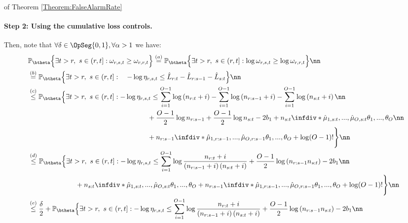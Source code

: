 \documentclass{article} %
\begin{document}
\begin{myproof}{of Theorem \ref{Theorem:FalseAlarmRate}}
	\paragraph{Step 2: Using the cumulative loss controls.}
	Then, note that $\forall \delta \in \OpSeg{0,1}, \forall \alpha > 1$ we have:
	\begin{align}
	&\mathbb{P}_{\btheta}\Big\{ \exists  t>r, \ s \in \left(r,t \right]: \omega_{r,s,t} \geq \omega_{r,r,t} \Big\} \overset{(a)}{=} \mathbb{P}_{\btheta}\Big\{ \exists  t>r, \ s \in \left(r,t \right]: \log \omega_{r,s,t} \geq \log \omega_{r,r,t} \Big\} \nn \\
	& \overset{(b)}{=} \mathbb{P}_{\btheta} \Big\{ \exists  t>r, \ s \in \left(r,t \right]: \quad - \log \eta_{r,s,t} \leq  
	\hat{L}_{r:t} - \hat{L}_{r:s-1} - \hat{L}_{s:t}  \Big\} \nn  \\
& \overset{(c)}{\leq} \mathbb{P}_{\btheta} \Big\{ \exists  t>r, \ s \in \left(r,t \right]:  - \log \eta_{r,s,t} \leq  
	\sum_{i=1}^{O-1} \log \left( n_{r:t}+i  \right)
 - \sum_{i=1}^{O-1} \log \left( n_{r:s-1}+i  \right) - \sum_{i=1}^{O-1} \log \left( n_{s:t}+i  \right) \nn
   \\
	& \phantom{\mathbb{P}_{\btheta} \Big\{ \exists  t>r, \ s \in \left(r,t \right]:  - \log \eta_{r,s,t} \leq } 
 + \frac{O-1}{2} \log n_{r:s-1} + \frac{O-1}{2} \log n_{s:t} - 2b_1 + n_{s:t}\infdiv*{\hat{\mu}_{1,s:t}, ..., \hat{\mu}_{O,s:t}}{\theta_1,...,\theta_O} \nn \\
 & \phantom{\mathbb{P}_{\btheta} \Big\{ \exists  t>r, \ s \in \left(r,t \right]:  - \log \eta_{r,s,t} \leq }
+ n_{r:s-1}\infdiv*{\hat{\mu}_{1,r:s-1}, ..., \hat{\mu}_{O,r:s-1}}{\theta_1,...,\theta_O} + \log (O-1)!
 \Bigg\} \nn \\
& \overset{(d)}{\leq} \mathbb{P}_{\btheta} \Big\{ \exists  t>r, \ s \in \left(r,t \right]:  - \log \eta_{r,s,t} \leq  
	\sum_{i=1}^{O-1} \log \frac{n_{r:t}+i}{\left( n_{r:s-1}+i  \right)\left( n_{s:t}+i  \right)}  + \frac{O-1}{2} \log \left( n_{r:s-1} n_{s:t}\right) - 2b_1  \nn 
   \\
	& \phantom{\mathbb{P}_{\btheta} \Big\{ \exists  t>r,   } 
 + n_{s:t}\infdiv*{\hat{\mu}_{1,s:t}, ..., \hat{\mu}_{O,s:t}}{\theta_1,...,\theta_O} 
+ n_{r:s-1}\infdiv*{\hat{\mu}_{1,r:s-1}, ..., \hat{\mu}_{O,r:s-1}}{\theta_1,...,\theta_O} + \log (O-1)!
 \Bigg\} \nn \\
 & \overset{(e)}{\leq} \frac{\delta}{2} + \mathbb{P}_{\btheta} \Big\{ \exists  t>r, \ s \in \left(r,t \right]:  - \log \eta_{r,s,t} \leq  
	\sum_{i=1}^{O-1} \log \frac{n_{r:t}+i}{\left( n_{r:s-1}+i  \right)\left( n_{s:t}+i  \right)}  + \frac{O-1}{2} \log \left( n_{r:s-1} n_{s:t}\right) - 2b_1 \nn

\end{align}
\end{myproof}
\end{document}
